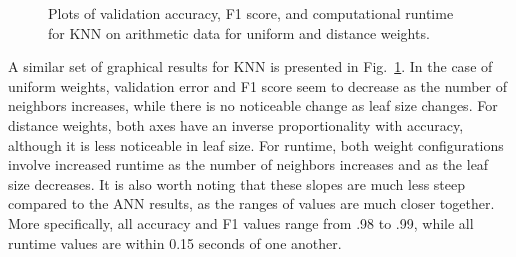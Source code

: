 \documentclass[12pt]{uthesis-v12}  %
\begin{document}
\begin{figure}
	\hfill	
{}
						
\caption{Plots of validation accuracy, F1 score, and computational runtime for KNN on arithmetic data for uniform and distance weights.}
	\label{knn-nata}
	\end{figure}
	
A similar set of graphical results for KNN is presented in Fig.~\ref{knn-nata}. In the case of uniform weights, validation error and F1 score seem to decrease as the number of neighbors increases, while there is no noticeable change as leaf size changes. For distance weights, both axes have an inverse proportionality with accuracy, although it is less noticeable in leaf size.	For runtime, both weight configurations involve increased runtime as the number of neighbors increases and as the leaf size decreases. It is also worth noting that these slopes are much less steep compared to the ANN results, as the ranges of values are much closer together. More specifically, all accuracy and F1 values range from .98 to .99, while all runtime values are within 0.15 seconds of one another. 
\end{document}
